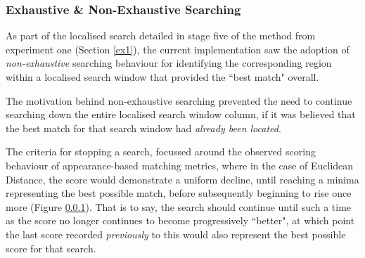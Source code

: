\subsubsection{Exhaustive \& Non-Exhaustive Searching}

As part of the localised search detailed in stage five of the method from experiment one (Section \ref{ex1}), the current implementation saw the adoption of \textit{non-exhaustive} searching behaviour for identifying the corresponding region within a localised search window that provided the ``best match" overall. 

The motivation behind non-exhaustive searching prevented the need to continue searching down the entire localised search window column, if it was believed that the best match for that search window had \textit{already been located}. 

The criteria for stopping a search, focussed around the observed scoring behaviour of appearance-based matching metrics, where in the case of Euclidean Distance, the score would demonstrate a uniform decline, until reaching a minima representing the best possible match, before subsequently beginning to rise once more (Figure \ref{}). That is to say, the search should continue until such a time as the score no longer continues to become progressively ``better", at which point the last score recorded \textit{previously} to this would also represent the best possible score for that search.

